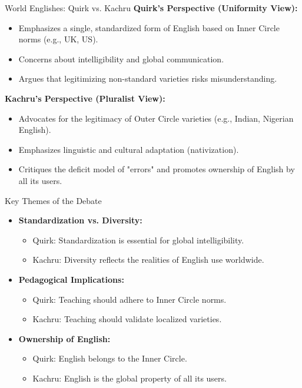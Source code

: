 \documentclass{beamer}
\begin{document}
\begin{frame}{World Englishes: Quirk vs. Kachru}
\textbf{Quirk's Perspective (Uniformity View):}
\begin{itemize}
    \item Emphasizes a single, standardized form of English based on Inner Circle norms (e.g., UK, US).
    \item Concerns about intelligibility and global communication.
    \item Argues that legitimizing non-standard varieties risks misunderstanding.
\end{itemize}

\textbf{Kachru's Perspective (Pluralist View):}
\begin{itemize}
    \item Advocates for the legitimacy of Outer Circle varieties (e.g., Indian, Nigerian English).
    \item Emphasizes linguistic and cultural adaptation (nativization).
    \item Critiques the deficit model of "errors" and promotes ownership of English by all its users.
\end{itemize}
\end{frame}

\begin{frame}{Key Themes of the Debate}
\begin{itemize}
    \item \textbf{Standardization vs. Diversity:}
    \begin{itemize}
        \item Quirk: Standardization is essential for global intelligibility.
        \item Kachru: Diversity reflects the realities of English use worldwide.
    \end{itemize}
    \item \textbf{Pedagogical Implications:}
    \begin{itemize}
        \item Quirk: Teaching should adhere to Inner Circle norms.
        \item Kachru: Teaching should validate localized varieties.
    \end{itemize}
    \item \textbf{Ownership of English:}
    \begin{itemize}
        \item Quirk: English belongs to the Inner Circle.
        \item Kachru: English is the global property of all its users.
    \end{itemize}
\end{itemize}
\end{frame}
\end{document}
